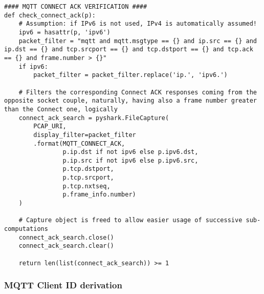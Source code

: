 \documentclass[a4paper,11pt]{article} %
\begin{document}
    \begin{verbatim}
#### MQTT CONNECT ACK VERIFICATION ####
def check_connect_ack(p):
    # Assumption: if IPv6 is not used, IPv4 is automatically assumed!
    ipv6 = hasattr(p, 'ipv6')
    packet_filter = "mqtt and mqtt.msgtype == {} and ip.src == {} and ip.dst == {} and tcp.srcport == {} and tcp.dstport == {} and tcp.ack == {} and frame.number > {}"
    if ipv6:
        packet_filter = packet_filter.replace('ip.', 'ipv6.')

    # Filters the corresponding Connect ACK responses coming from the opposite socket couple, naturally, having also a frame number greater than the Connect one, logically
    connect_ack_search = pyshark.FileCapture(
        PCAP_URI,
        display_filter=packet_filter
        .format(MQTT_CONNECT_ACK,
                p.ip.dst if not ipv6 else p.ipv6.dst,
                p.ip.src if not ipv6 else p.ipv6.src,
                p.tcp.dstport,
                p.tcp.srcport,
                p.tcp.nxtseq,
                p.frame_info.number)
    )

    # Capture object is freed to allow easier usage of successive sub-computations
    connect_ack_search.close()
    connect_ack_search.clear()

    return len(list(connect_ack_search)) >= 1
    \end{verbatim}

    \subsubsection{MQTT Client ID derivation}
    \label{subsubsec:mqtt-clientid-python}
\end{document}
